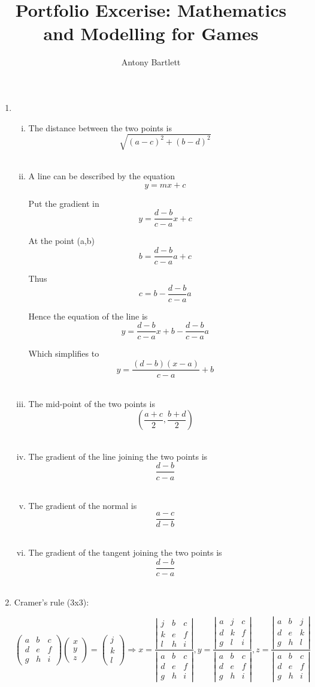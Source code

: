 \documentclass{article}
\def\cramersMatrix#1#2#3#4#5#6#7#8#9{
  \def\a{{#1}}
  \def\b{{#2}}
  \def\c{{#3}}
  \def\d{{#4}}
  \def\e{{#5}}
  \def\f{{#6}}
  \def\g{{#7}}
  \def\h{{#8}}
  \def\i{{#9}}
}
\def\cramersVector#1#2#3{
  \def\j{{#1}}
  \def\k{{#2}}
  \def\l{{#3}}
}
\newcommand{\cramers}[0]
{
\[
	\left(
		\begin{array}{ccc}
			\a & \b & \c \\
			\d & \e & \f \\
			\g & \h & \i
		\end{array}
	\right)
	\left(
		\begin{array}{c}
			x \\
			y \\
			z
		\end{array}
	\right)
	=
	\left(
		\begin{array}{c}
			\j \\
			\k \\
			\l
		\end{array}
	\right)
	\Rightarrow
	x=
	\frac
	{
		\left|
			\begin{array}{ccc}
				\j & \b & \c \\
				\k & \e & \f \\
				\l & \h & \i
			\end{array}
		\right|
	}
	{
		\left|
			\begin{array}{ccc}
				\a & \b & \c \\
				\d & \e & \f \\
				\g & \h & \i
			\end{array}
		\right|
	},
	y=
	\frac
	{
		\left|
			\begin{array}{ccc}
				\a & \j & \c \\
				\d & \k & \f \\
				\g & \l & \i
			\end{array}
		\right|
	}
	{
		\left|
			\begin{array}{ccc}
				\a & \b & \c \\
				\d & \e & \f \\
				\g & \h & \i
			\end{array}
		\right|
	},
	z=
	\frac
	{
		\left|
			\begin{array}{ccc}
				\a & \b & \j \\
				\d & \e & \k \\
				\g & \h & \l
			\end{array}
		\right|
	}
	{
		\left|
			\begin{array}{ccc}
				\a & \b & \c \\
				\d & \e & \f \\
				\g & \h & \i
			\end{array}
		\right|
	}
\]
}
\begin{document}
\title{Portfolio Excerise: Mathematics and Modelling for Games}
\author{Antony Bartlett}
\maketitle
\begin{enumerate}

\item

\begin{enumerate}[i.]

\item The distance between the two points is
\[
\sqrt{ (a-c)^2 + (b-d)^2 }
\]
\\

\item A line can be described by the equation
\[
y=mx+c
\]

Put the gradient in
\[
y=\frac{d-b}{c-a}x+c
\]

At the point (a,b)
\[
b=\frac{d-b}{c-a}a + c
\]

Thus
\[
c=b - \frac{d-b}{c-a}a
\]

Hence the equation of the line is
\[
y=\frac{d-b}{c-a}x+b - \frac{d-b}{c-a}a
\]

Which simplifies to
\[
y=\frac{(d-b)(x-a)}{c-a} + b
\]
\\

\item The mid-point of the two points is
\[
(\frac{a+c}{2}, \frac{b+d}{2})
\]
\\

\item The gradient of the line joining the two points is
\[
\frac{d-b}{c-a}
\]
\\

\item The gradient of the normal is
\[
\frac{a-c}{d-b}
\]
\\

\item The gradient of the tangent joining the two points is
\[
\frac{d-b}{c-a}
\]
\\

\end{enumerate}

\item Cramer's rule (3x3):
\cramersMatrix{a}{b}{c}{d}{e}{f}{g}{h}{i}
\cramersVector{j}{k}{l}
\cramers


\end{enumerate}
\end{document}
